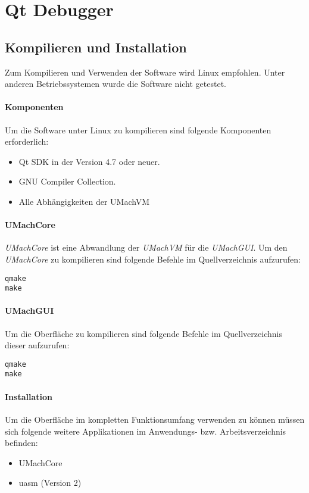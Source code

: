 \section{Qt Debugger}

\subsection{Kompilieren und Installation}

Zum Kompilieren und Verwenden der Software wird Linux empfohlen. Unter anderen Betriebssystemen wurde die Software nicht getestet.

\paragraph{Komponenten}
Um die Software unter Linux zu kompilieren sind folgende Komponenten erforderlich:
\begin{itemize}
	\item Qt SDK in der Version 4.7 oder neuer.
	\item GNU Compiler Collection.
	\item Alle Abhängigkeiten der UMachVM
\end{itemize}

\paragraph{UMachCore}
\emph{UMachCore} ist eine Abwandlung der \emph{UMachVM} für die \emph{UMachGUI}. Um den \emph{UMachCore}  zu kompilieren sind folgende Befehle im Quellverzeichnis aufzurufen:
\begin{lstlisting}
qmake
make
\end{lstlisting}

\paragraph{UMachGUI}
Um die Oberfläche zu kompilieren sind folgende Befehle im Quellverzeichnis dieser aufzurufen:
\begin{lstlisting}
qmake
make
\end{lstlisting}

\paragraph{Installation}
Um die Oberfläche im kompletten Funktionsumfang verwenden zu können müssen sich folgende weitere Applikationen im Anwendungs- bzw. Arbeitsverzeichnis befinden:
\begin{itemize}
	\item UMachCore
	\item uasm (Version 2)
\end{itemize}

